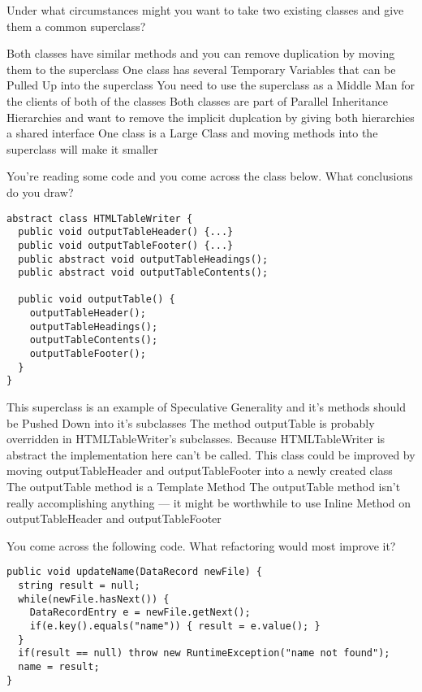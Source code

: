 \documentclass{exam}
\begin{document}
\begin{questions}
\question[1] Under what circumstances might you want to take two existing classes and give them a common superclass?

\begin{choices}
\choice Both classes have similar methods and you can remove duplication by moving them to the superclass
\choice One class has several Temporary Variables that can be Pulled Up into the superclass
\choice You need to use the superclass as a Middle Man for the clients of both of the classes
\choice Both classes are part of Parallel Inheritance Hierarchies and want to remove the implicit duplcation by giving both hierarchies a shared interface
\choice One class is a Large Class and moving methods into the superclass will make it smaller
\end{choices}

\question[1] You're reading some code and you come across the class below.  What conclusions do you draw?
\begin{lstlisting}
abstract class HTMLTableWriter {
  public void outputTableHeader() {...}
  public void outputTableFooter() {...}
  public abstract void outputTableHeadings();
  public abstract void outputTableContents();

  public void outputTable() {
    outputTableHeader();
    outputTableHeadings();
    outputTableContents();
    outputTableFooter();
  }
}

\end{lstlisting}

\begin{choices}
\choice This superclass is an example of Speculative Generality and it's methods should be Pushed Down into it's subclasses
\choice The method outputTable is probably overridden in HTMLTableWriter's subclasses.  Because HTMLTableWriter is abstract the implementation here can't be called.
\choice This class could be improved by moving outputTableHeader and outputTableFooter into a newly created class
\choice The outputTable method is a Template Method
\choice The outputTable method isn't really accomplishing anything --- it might be worthwhile to use Inline Method on outputTableHeader and outputTableFooter
\end{choices}

\question[1] You come across the following code.  What refactoring would most improve it?
\begin{lstlisting}
public void updateName(DataRecord newFile) {
  string result = null;
  while(newFile.hasNext()) {
    DataRecordEntry e = newFile.getNext();
    if(e.key().equals("name")) { result = e.value(); }
  }
  if(result == null) throw new RuntimeException("name not found");
  name = result;
}


\end{lstlisting}
\end{questions}
\end{document}
